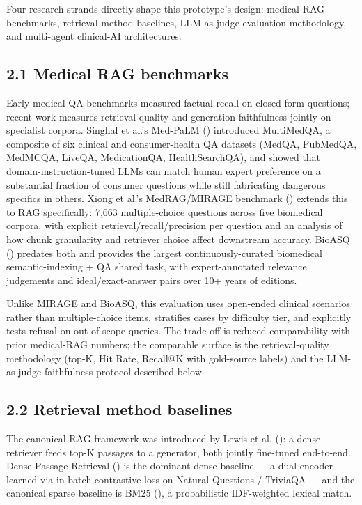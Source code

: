 \documentclass[
  american,
  a4paper,
]{article}
\begin{document}
Four research strands directly shape this prototype's design: medical
RAG benchmarks, retrieval-method baselines, LLM-as-judge evaluation
methodology, and multi-agent clinical-AI architectures.

\subsection{2.1 Medical RAG benchmarks}\label{medical-rag-benchmarks}

Early medical QA benchmarks measured factual recall on closed-form
questions; recent work measures retrieval quality and generation
faithfulness jointly on specialist corpora. Singhal et al.'s Med-PaLM
() introduced
MultiMedQA, a composite of six clinical and consumer-health QA datasets
(MedQA, PubMedQA, MedMCQA, LiveQA, MedicationQA, HealthSearchQA), and
showed that domain-instruction-tuned LLMs can match human expert
preference on a substantial fraction of consumer questions while still
fabricating dangerous specifics in others. Xiong et al.'s MedRAG/MIRAGE
benchmark () extends
this to RAG specifically: 7,663 multiple-choice questions across five
biomedical corpora, with explicit retrieval/recall/precision per
question and an analysis of how chunk granularity and retriever choice
affect downstream accuracy. BioASQ
()
predates both and provides the largest continuously-curated biomedical
semantic-indexing + QA shared task, with expert-annotated relevance
judgements and ideal/exact-answer pairs over 10+ years of editions.

Unlike MIRAGE and BioASQ, this evaluation uses open-ended clinical
scenarios rather than multiple-choice items, stratifies cases by
difficulty tier, and explicitly tests refusal on out-of-scope queries.
The trade-off is reduced comparability with prior medical-RAG numbers;
the comparable surface is the retrieval-quality methodology (top-K, Hit
Rate, Recall@K with gold-source labels) and the LLM-as-judge
faithfulness protocol described below.

\subsection{2.2 Retrieval method
baselines}\label{retrieval-method-baselines}

The canonical RAG framework was introduced by Lewis et al.
(): a dense retriever feeds top-K
passages to a generator, both jointly fine-tuned end-to-end. Dense
Passage Retrieval () is the dominant dense baseline --- a dual-encoder learned via
in-batch contrastive loss on Natural Questions / TriviaQA --- and the
canonical sparse baseline is BM25
(), a
probabilistic IDF-weighted lexical match.
\end{document}
